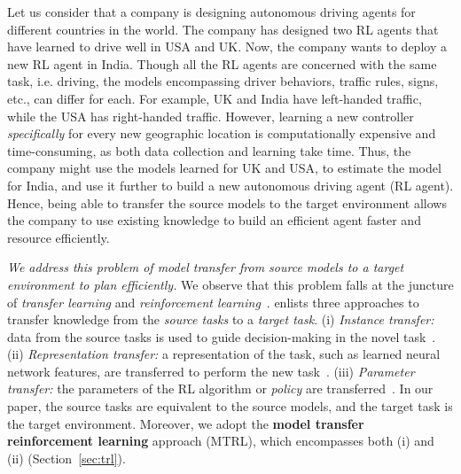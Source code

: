 Let us consider that a company is designing autonomous driving agents for different countries in the world. The company has designed two RL agents that have learned to drive well in USA and UK. Now, the company wants to deploy a new RL agent in India. Though all the RL agents are concerned with the same task, i.e. driving, the models encompassing driver behaviors, traffic rules, signs, etc., can differ for each. For example, UK and India have left-handed traffic, while the USA has right-handed traffic.  However, learning a new controller \emph{specifically} for every new geographic location is computationally expensive and time-consuming, as both data collection and learning take time. Thus, the company might use the models learned for UK and USA, to estimate the model for India, and use it further to build a new autonomous driving agent (RL agent). Hence, being able to transfer the source models to the target environment allows the company to use existing knowledge to build an efficient agent faster and resource efficiently.

\textit{We address this problem of model transfer from source models to a target environment to plan efficiently.} We observe that this problem falls at the juncture of \emph{transfer learning} and \emph{reinforcement learning}~\citep{taylor2009transfer,lazaric2012transfer,laroche2017transfer}. %
\citep{lazaric2012transfer} enlists three approaches to transfer knowledge from the \emph{source tasks} to a \emph{target task}. (i) \emph{Instance transfer:} data from the source tasks is used to guide decision-making in the novel task~\citep{taylor2008transferring}. (ii) \emph{Representation transfer:} a representation of the task, such as learned neural network features, are transferred to perform the new task~\citep{zhang2018decoupling}. (iii) \emph{Parameter transfer:} the parameters of the RL algorithm or \emph{policy} are transferred~\citep{rusu2015policy}. In our paper, the source tasks are equivalent to the source models, and the target task is the target environment. Moreover, we adopt the \textbf{model transfer reinforcement learning} approach (MTRL), which encompasses both (i) and (ii) (Section~\ref{sec:trl}). 

